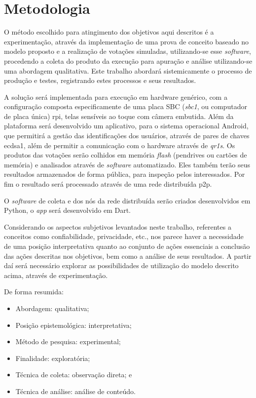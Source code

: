 \chapter{Metodologia}

O método escolhido para atingimento dos objetivos aqui descritos é a experimentação, através da implementação de uma prova de conceito baseado no modelo proposto e a realização de votações simuladas, utilizando-se esse \textit{software}, procedendo a coleta do produto da execução para apuração e análise utilizando-se uma abordagem qualitativa. Este trabalho abordará sistemicamente o processo de produção e testes, registrando estes processos e seus resultados.  

A solução será implementada para execução em hardware genérico, com a configuração composta especificamente de uma placa SBC (\textit{\gls{sbc1}}, ou computador de placa única) \gls{rpi}, telas sensíveis ao toque com câmera embutida. Além da plataforma será desenvolvido um aplicativo, para o sistema operacional Android, que permitirá a gestão das identificações dos usuários, através de pares de chaves \gls{ecdsa1}, além de permitir a comunicação com o hardware através de \textit{\glspl{qr1}}.  Os produtos das votações serão colhidos em memória \textit{flash} (pendrives ou cartões de memória) e analisados através de \textit{software} automatizado. Eles também terão seus resultados armazenados de forma pública, para inspeção pelos interessados. Por fim o resultado será processado através de uma rede distribuída \gls{p2p}. 

O \textit{software} de coleta e dos nós da rede distribuída serão criados desenvolvidos em Python, o \textit{app} será desenvolvido em Dart.  

Considerando os aspectos subjetivos levantados neste trabalho, referentes a conceitos como confiabilidade, privacidade, etc., nos parece haver a necessidade de uma posição interpretativa quanto ao conjunto de ações essenciais a conclusão das ações descritas nos objetivos, bem como a análise de seus resultados. A partir daí será necessário explorar as possibilidades de utilização do modelo descrito acima, através de experimentação.

De forma resumida: 
\begin{itemize}   

\item Abordagem: qualitativa; 
\item Posição epistemológica: interpretativa;
\item Método de pesquisa: experimental;
\item Finalidade: exploratória;
\item Técnica de coleta: observação direta; e
\item Técnica de análise: análise de conteúdo.
\end{itemize}